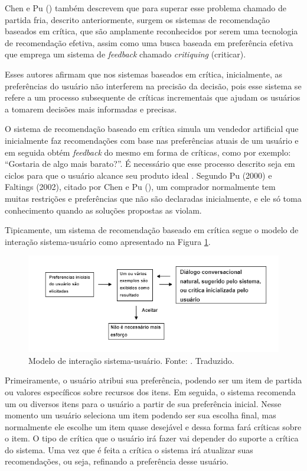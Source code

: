 Chen e Pu (\citeyear{Chen:2012}) também descrevem que para superar esse problema chamado de partida fria, descrito anteriormente, surgem os sistemas de recomendação baseados em crítica, que são amplamente reconhecidos por serem uma tecnologia de recomendação efetiva, assim como uma busca baseada em preferência efetiva que emprega um sistema de \textit{feedback} chamado \textit{critiquing} (criticar).

Esses autores afirmam que nos sistemas baseados em crítica, inicialmente, as preferências do usuário não interferem na precisão da decisão, pois esse sistema se refere a um processo subsequente de críticas incrementais que ajudam os usuários a tomarem decisões mais informadas e precisas.

O sistema de recomendação baseado em crítica simula um vendedor artificial que inicialmente faz recomendações com base nas preferências atuais de um usuário e em seguida obtém \textit{feedback} do mesmo em forma de críticas, como por exemplo: “Gostaria de algo mais barato?”. É necessário que esse processo descrito seja em ciclos para que o usuário alcance seu produto ideal \cite{Chen:2012}. Segundo Pu (2000) e Faltings (2002), citado por Chen e Pu (\citeyear{Chen:2012}), um comprador normalmente tem muitas restrições e preferências que não são declaradas inicialmente, e ele só toma conhecimento quando as soluções propostas as violam.

Tipicamente, um sistema de recomendação baseado em crítica segue o modelo de interação sistema-usuário como apresentado na Figura \ref{fig:sistema_usuario}.

\begin{figure}[H]
    \centering
    \includegraphics[scale=0.45]{figuras/referencial_teorico/sistema_usuario.png}
    \caption[Modelo de interação sistema-usuário]{Modelo de interação sistema-usuário. Fonte: \cite{Chen:2012}. Traduzido.}
    \label{fig:sistema_usuario}
\end{figure}

Primeiramente, o usuário atribui sua preferência, podendo ser um item de partida ou valores específicos sobre recursos dos itens. Em seguida, o sistema recomenda um ou diversos itens para o usuário a partir de sua preferência inicial. Nesse momento um usuário seleciona um item podendo ser sua escolha final, mas normalmente ele escolhe um item quase desejável e dessa forma fará críticas sobre o item. O tipo de crítica que o usuário irá fazer vai depender do suporte a crítica do sistema. Uma vez que é feita a crítica o sistema irá atualizar suas recomendações, ou seja, refinando a preferência desse usuário.

